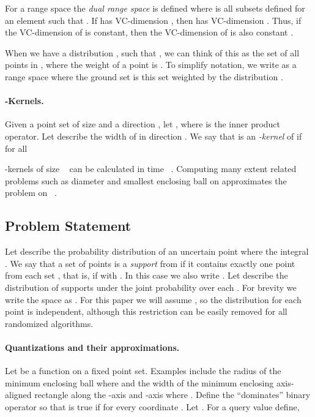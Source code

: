 \documentclass{journal}
\newcommand{\pset}{support\xspace}
\begin{document}
For a range space  the \emph{dual range space} is defined  where  is all subsets  defined for an element  such that .  If  has VC-dimension , then  has VC-dimension .  Thus, if the VC-dimension of  is constant, then the VC-dimension of  is also constant \cite{Mat99}.  


When we have a distribution , such that , we can think of this as the set  of all points in , where the weight  of a point  is .  
To simplify notation, we write  as a range space where the ground set is this set  weighted by the distribution .


\paragraph{-Kernels.}
Given a point set  of size  and a direction , let , where  is the inner product operator.
Let  describe the width of  in direction .
We say that  is an \emph{-kernel} of  if for all 

-kernels of size ~\cite{AHV04} can be calculated in time ~\cite{Cha06,YAPV04}.  Computing many extent related problems such as diameter and smallest enclosing ball on  approximates the problem on ~\cite{AHV04,AHV07,Cha06}.


\subsection{Problem Statement}  
Let  describe the probability distribution of an uncertain point  where the integral .
We say that a set  of  points is a \emph {\pset} from  if it contains exactly one point from each set , that is, if  with .
In this case we also write .
Let  describe the distribution of supports  under the joint probability over each .
For brevity we write the space  as .
For this paper we will assume , so the distribution for each point is independent, although  this restriction can be easily removed for all randomized algorithms.



\paragraph{Quantizations and their approximations.}
Let  be a function on a fixed point set.  Examples include the radius of the minimum enclosing ball where  and the width of the minimum enclosing axis-aligned rectangle along the -axis and -axis where .
Define the ``dominates'' binary operator  so that  is true if for every coordinate .
Let .
For a query value  define,
\end{document}
